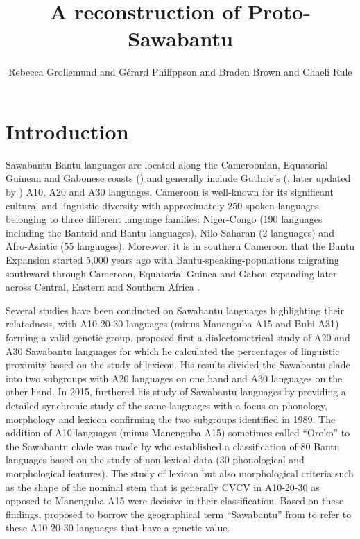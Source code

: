 \documentclass[output=paper,colorlinks,citecolor=brown
]{langscibook}
\author{Rebecca Grollemund\affiliation{University of Missouri} and Gérard Philippson\affiliation{Laboratoire Dynamique Du Langage, CNRS} and Braden Brown\affiliation{University of Missouri} and  Chaeli Rule\affiliation{The Ohio State University}}
\title{A reconstruction of Proto-Sawabantu}
\begin{document}
\maketitle
\section{Introduction} \label{sect:grollemundbrownrule:introduction}

Sawabantu Bantu languages are located along the Cameroonian, Equatorial Guinean and Gabonese coasts () and generally include Guthrie’s (\citealt{guthriecomparativebantu}, later updated by \citealt{maho2009}) A10, A20 and A30 languages. Cameroon is well-known for its significant cultural and linguistic diversity with approximately 250 spoken languages \citep{eberhardetal2019} belonging to three different language families: Niger-Congo (190 languages including the Bantoid and Bantu languages), Nilo-Saharan (2 languages) and Afro-Asiatic (55 languages). Moreover, it is in southern Cameroon that the Bantu Expansion started 5,000 years ago with Bantu-speaking-populations migrating southward through Cameroon, Equatorial Guinea and Gabon expanding later across Central, Eastern and Southern Africa \citep{bostoen2007, grollemundetal2015, koileetal2022}.

Several studies have been conducted on Sawabantu languages highlighting their relatedness, with A10-20-30 languages (minus Manenguba A15 and Bubi A31) forming a valid genetic group. \citet{ebobisse1989} proposed first a dialectometrical study of A20 and A30 Sawabantu languages for which he calculated the percentages of linguistic proximity based on the study of lexicon. His results divided the Sawabantu clade into two subgroups with A20 languages on one hand and A30 languages on the other hand. In 2015, \citet{ebobisse2015} furthered his study of Sawabantu languages by providing a detailed synchronic study of the same languages with a focus on phonology, morphology and lexicon confirming the two subgroups identified in 1989. The addition of A10 languages (minus Manenguba A15) sometimes called “Oroko” \citep{friesen2002} to the Sawabantu clade was made by \citet[170]{nurseandphilippson2003} who established a classification of 80 Bantu languages based on the study of non-lexical data (30 phonological and morphological features). The study of lexicon but also morphological criteria such as the shape of the nominal stem that is generally CVCV in A10-20-30 as opposed to Manenguba A15 \citep[6-7]{philippson2022} were decisive in their classification. Based on these findings, \citet{philippson2022} proposed to borrow the geographical term “Sawabantu” from \citet{ebobisse2015} to refer to these A10-20-30 languages that have a genetic value.
\end{document}
